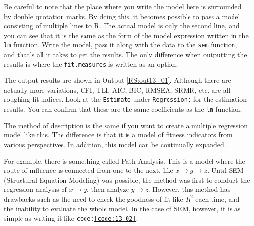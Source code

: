 \documentclass{ltjsbook}
\begin{document}
Be careful to note that the place where you write the model here is surrounded by double quotation marks. By doing this, it becomes possible to pass a model consisting of multiple lines to R. The actual model is only the second line, and you can see that it is the same as the form of the model expression written in the \texttt{lm} function. Write the model, pass it along with the data to the \texttt{sem} function, and that's all it takes to get the results. The only difference when outputting the results is where the \texttt{fit.measures} is written as an option.

The output results are shown in Output \ref{RS:out13_01}. Although there are actually more variations, CFI, TLI, AIC, BIC, RMSEA, SRMR, etc. are all roughing fit indices. Look at the \texttt{Estimate} under \texttt{Regression:} for the estimation results. You can confirm that these are the same coefficients as the \texttt{lm} function.



The method of description is the same if you want to create a multiple regression model like this. The difference is that it is a model of fitness indicators from various perspectives. In addition, this model can be continually expanded.

For example, there is something called Path Analysis. This is a model where the route of influence is connected from one to the next, like $x \to y \to z$. Until SEM (Structural Equation Modeling) was possible, the method was first to conduct the regression analysis of $x \to y$, then analyze $y \to z$. However, this method has drawbacks such as the need to check the goodness of fit like $R^2$ each time, and the inability to evaluate the whole model. In the case of SEM, however, it is as simple as writing it like \texttt{code:\ref{code:13_02}}.
\end{document}
